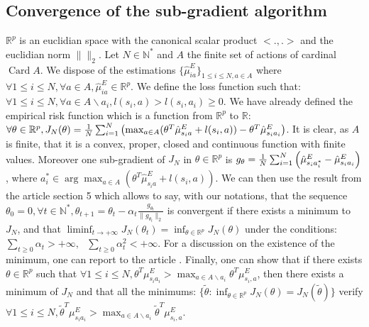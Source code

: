 \documentclass{article}
\newcommand{\card}{\operatorname*{Card}}
\begin{document}
\subsection{Convergence of the sub-gradient algorithm}
$\mathbb{R}^p$ is an euclidian space with the canonical scalar product $<.,.>$ and the euclidian norm $\|\|_2$.
Let $N\in\mathbb{N}^*$ and $A$ the finite set of actions of cardinal $\card{A}$. We dispose of the estimations  $\{\hat{\mu}^E_{ia}\}_{1\leq i \leq N,a\in A}$ where $\forall 1\leq i \leq N, \forall a\in A,\hat{\mu}^E_{ia}\in\mathbb{R}^p$.
We define the loss function such that: $\forall 1\leq i \leq N,\forall a\in A\backslash{a_i}, l(s_i,a)>l(s_i,a_i)\geq0$. We have already defined the empirical risk function which is a function from $\mathbb{R}^p$ to $\mathbb{R}$:
$\forall \theta\in\mathbb{R}^p, J_N(\theta)= {1\over N} \sum_{i=1}^N\left(\max_{a\in A}(\theta ^T \hat{\mu}^E_{s_ia} + l(s_i,a)) - \theta ^T \hat{\mu}^E_{s_ia_i} \right)$. It is clear, as $A$ is finite, that it is a convex, proper, closed and continuous function
with finite values. Moreover one sub-gradient of $J_N$ in $\theta\in\mathbb{R}^p$ is $g_{\theta}={1\over N}\sum_{i=1}^N\left(\hat{\mu}^E_{s_ia^*_i} - \hat{\mu}^E_{s_ia_i}\right)$, where $a^*_i\in\arg\max_{a\in A}(\theta ^T \hat{\mu}^E_{s_ia} + l(s_i,a))$.
We can then use the result from the article \cite{correa1993convergence} section 5 which allows to say, with our notations, that the sequence $\theta_0=0,\forall t\in \mathbb{N}^*,\theta_{t+1}=\theta_t-\alpha_t\frac{g_{\theta_t}}{\|g_{\theta_t}\|_2}$ is convergent
if there exists a minimum to $J_N$, and that $\liminf_{t\rightarrow +\infty}J_N(\theta_t)=\inf_{\theta\in\mathbb{R}^p}J_N(\theta)$ under the conditions: $\sum_{t\geq0}\alpha_t>+\infty,\text{ }\sum_{t\geq0}\alpha_t^2<+\infty$. For a discussion on the existence
of the minimum, one can report to the article \cite{kaufmann1988existence}. Finally, one can show that if there exists $\theta\in\mathbb{R}^p$ such that $\forall 1\leq i \leq N, \theta^T\mu^E_{s_ia_i}>\max_{a\in A \backslash a_i}\theta^T\mu^E_{s_i,a}$, then there exists a minimum of $J_N$ and that all the
minimums: $\{\tilde{\theta}: \inf_{\theta\in\mathbb{R}^p}J_N(\theta)=J_N(\tilde{\theta})\}$ verify $\forall 1\leq i \leq N, \tilde{\theta}^T\mu^E_{s_ia_i}>\max_{a\in A \backslash a_i}\tilde{\theta}^T\mu^E_{s_i,a}$.
\end{document}
